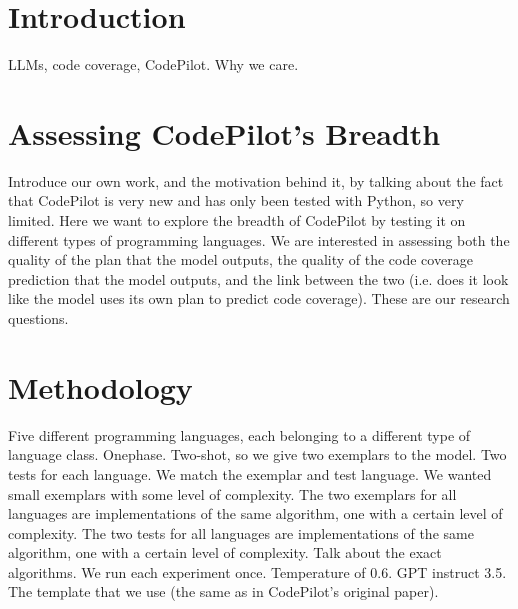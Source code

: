 \documentclass[sigconf]{acmart}
\begin{document}
\maketitle

\section{Introduction}
LLMs, code coverage, CodePilot. Why we care.

\section{Assessing CodePilot's Breadth}
Introduce our own work, and the motivation behind it, by talking about the fact that CodePilot is very new and has only been tested with Python, so very limited. Here we want to explore the breadth of CodePilot by testing it on different types of programming languages. We are interested in assessing both the quality of the plan that the model outputs, the quality of the code coverage prediction that the model outputs, and the link between the two (i.e. does it look like the model uses its own plan to predict code coverage). These are our research questions.

\section{Methodology}
Five different programming languages, each belonging to a different type of language class. Onephase. Two-shot, so we give two exemplars to the model. Two tests for each language. We match the exemplar and test language. We wanted small exemplars with some level of complexity. The two exemplars for all languages are implementations of the same algorithm, one with a certain level of complexity. The two tests for all languages are implementations of the same algorithm, one with a certain level of complexity. Talk about the exact algorithms. We run each experiment once. Temperature of 0.6. GPT instruct 3.5. The template that we use (the same as in CodePilot's original paper).
\end{document}
